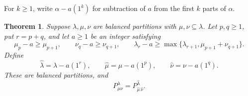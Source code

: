 \documentclass[11pt]{article}
\newtheorem{theorem}{Theorem}
\begin{document}
For $k\ge1$, write $\alpha-a(1^k)$ for subtraction
of $a$ from the first $k$ parts of $\alpha$.

\begin{theorem}\label{rect:thm:rectangle}
Suppose $\lambda,\mu,\nu$ are balanced partitions with
$\mu,\nu\subseteq\lambda$. Let $p,q\ge1$, put $r=p+q$,
and let $a\ge1$ be an integer satisfying
\begin{equation}\label{rect:eq:hypotheses}
\mu_p-a\ge\mu_{p+1},\qquad
\nu_q-a\ge\nu_{q+1},\qquad
\lambda_r-a\ge
\max\{\lambda_{r+1},\mu_{p+1}+\nu_{q+1}\}.
\end{equation}
Define
\[
\widehat\lambda=\lambda-a(1^r),\qquad
\widehat\mu=\mu-a(1^p),\qquad
\widehat\nu=\nu-a(1^q).
\]
These are balanced partitions, and
\begin{equation}\label{rect:eq:identity}
P^\lambda_{\mu\nu}
 =
P^{\widehat\lambda}_{\widehat\mu\,\widehat\nu}.
\end{equation}
\end{theorem}
\end{document}

